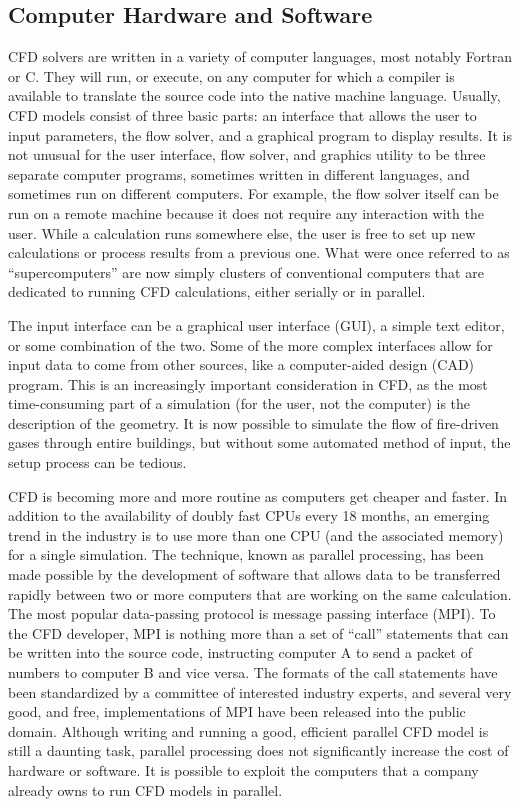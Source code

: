 \documentclass[graybox]{svmult}
\begin{document}
\subsection{Computer Hardware and Software}

CFD solvers are written in a variety of computer languages, most notably Fortran or C. They will run, or execute, on any computer for which a compiler is available to translate the source code into the native machine language. Usually, CFD models consist of three basic parts: an interface that allows the user to input parameters, the flow solver, and a graphical program to display results. It is not unusual for the user interface, flow solver, and graphics utility to be three separate computer programs, sometimes written in different languages, and sometimes run on different computers. For example, the flow solver itself can be run on a remote machine because it does not require any interaction with the user. While a calculation runs somewhere else, the user is free to set up new calculations or process results from a previous one. What were once referred to as ``supercomputers'' are now simply clusters of conventional computers that are dedicated to running CFD calculations, either serially or in parallel.

The input interface can be a graphical user interface (GUI), a simple text editor, or some combination of the two. Some of the more complex interfaces allow for input data to come from other sources, like a computer-aided design (CAD) program. This is an increasingly important consideration in CFD, as the most time-consuming part of a simulation (for the user, not the computer) is the description of the geometry. It is now possible to simulate the flow of fire-driven gases through entire buildings, but without some automated method of input, the setup process can be tedious.

CFD is becoming more and more routine as computers get cheaper and faster. In addition to the availability of doubly fast CPUs every 18 months, an emerging trend in the industry is to use more than one CPU (and the associated memory) for a single simulation. The technique, known as parallel processing, has been made possible by the development of software that allows data to be transferred rapidly between two or more computers that are working on the same calculation. The most popular data-passing protocol is message passing interface (MPI). To the CFD developer, MPI is nothing more than a set of ``call'' statements that can be written into the source code, instructing computer A to send a packet of numbers to computer B and vice versa. The formats of the call statements have been standardized by a committee of interested industry experts, and several very good, and free, implementations of MPI have been released into the public domain. Although writing and running a good, efficient parallel CFD model is still a daunting task, parallel processing does not significantly increase the cost of hardware or software. It is possible to exploit the computers that a company already owns to run CFD models in parallel.
\end{document}
